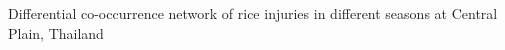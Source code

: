 Differential co-occurrence network of rice injuries in different seasons at Central Plain, Thailand
\label{fig:difseasonCP}